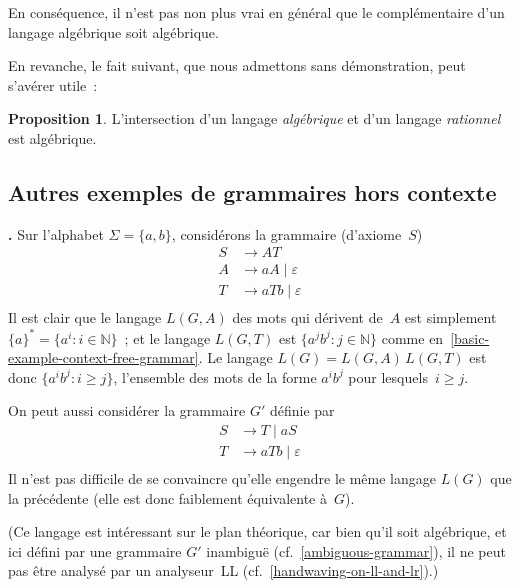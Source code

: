 \documentclass[12pt,a4paper]{article}
\theoremstyle{definition}
\newcommand\thingy{%
\refstepcounter{comcnt}\medskip\noindent\textbf{\thecomcnt.} }
\newtheorem{prop}[comcnt]{Proposition}
\begin{document}
En conséquence, il n'est pas non plus vrai en général que le
complémentaire d'un langage algébrique soit algébrique.

\smallskip

En revanche, le fait suivant, que nous admettons sans démonstration,
peut s'avérer utile :

\begin{prop}\label{intersection-of-algebraic-and-rational}
L'intersection d'un langage \emph{algébrique} et d'un langage
\emph{rationnel} est algébrique.
\end{prop}


\subsection{Autres exemples de grammaires hors contexte}

\thingy\label{example-lr-non-ll-grammar} Sur l'alphabet $\Sigma =
\{a,b\}$, considérons la grammaire (d'axiome $S$)
\[
\begin{aligned}
S &\rightarrow AT\\
A &\rightarrow aA \;|\; \varepsilon\\
T &\rightarrow aTb \;|\; \varepsilon\\
\end{aligned}
\]
Il est clair que le langage $L(G,A)$ des mots qui dérivent de $A$ est
simplement $\{a\}^* = \{a^i : i\in\mathbb{N}\}$ ; et le langage
$L(G,T)$ est $\{a^j b^j : j\in\mathbb{N}\}$ comme
en \ref{basic-example-context-free-grammar}.  Le langage $L(G) =
L(G,A)\, L(G,T)$ est donc $\{a^i b^j : i \geq j\}$, l'ensemble des
mots de la forme $a^i b^j$ pour lesquels $i \geq j$.

On peut aussi considérer la grammaire $G'$ définie par
\[
\begin{aligned}
S &\rightarrow T \;|\; aS\\
T &\rightarrow aTb \;|\; \varepsilon\\
\end{aligned}
\]
Il n'est pas difficile de se convaincre qu'elle engendre le même
langage $L(G)$ que la précédente (elle est donc faiblement équivalente
à $G$).

{\footnotesize (Ce langage est intéressant sur le plan théorique, car
  bien qu'il soit algébrique, et ici défini par une grammaire $G'$
  inambiguë (cf. \ref{ambiguous-grammar}), il ne peut pas être analysé
  par un analyseur LL (cf. \ref{handwaving-on-ll-and-lr}).)\par}
\end{document}
